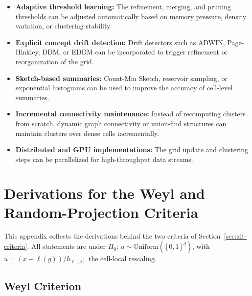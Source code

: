 \documentclass[11pt]{article}
\begin{document}
\begin{itemize}
    \item \textbf{Adaptive threshold learning:} The refinement, merging, and pruning thresholds can be adjusted automatically based on memory pressure, density variation, or clustering stability.
    
    \item \textbf{Explicit concept drift detection:} Drift detectors such as ADWIN, Page-Hinkley, DDM, or EDDM can be incorporated to trigger refinement or reorganization of the grid.
    
    \item \textbf{Sketch-based summaries:} Count-Min Sketch, reservoir sampling, or exponential histograms can be used to improve the accuracy of cell-level summaries.
    
    \item \textbf{Incremental connectivity maintenance:} Instead of recomputing clusters from scratch, dynamic graph connectivity or union-find structures can maintain clusters over dense cells incrementally.
    
    \item \textbf{Distributed and GPU implementations:} The grid update and clustering steps can be parallelized for high-throughput data streams.
\end{itemize}

\appendix

\section{Derivations for the Weyl and Random-Projection Criteria}
\label{app:criteria-proofs}

This appendix collects the derivations behind the two criteria of Section~\ref{sec:alt-criteria}. All statements are under $H_0$: $u \sim \mathrm{Uniform}([0,1]^d)$, with $u = (x-\ell(g))/h_{\ell(g)}$ the cell-local rescaling.

\subsection{Weyl Criterion}
\end{document}

